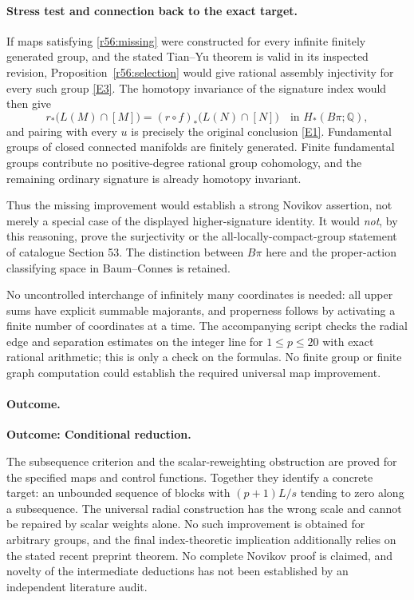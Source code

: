 \documentclass[11pt,a4paper]{article}
\newcommand{\Q}{\mathbb{Q}}
\newcommand{\eref}[2]{\hyperlink{extra:#1:#2}{[E#2]}}
\numberwithin{equation}{section}
\begin{document}
\paragraph{Stress test and connection back to the exact target.}
If maps satisfying \eqref{r56:missing} were constructed for every infinite finitely generated group, and the stated Tian--Yu theorem is valid in its inspected revision, Proposition~\ref{r56:selection} would give rational assembly injectivity for every such group \eref{56}{3}. The homotopy invariance of the signature index would then give
\[
 r_*\bigl(L(M)\cap[M]\bigr)
  =(r\circ f)_*\bigl(L(N)\cap[N]\bigr)
       \quad\text{in }H_*(B\pi;\Q),
\]
and pairing with every $u$ is precisely the original conclusion \eref{56}{1}. Fundamental groups of closed connected manifolds are finitely generated. Finite fundamental groups contribute no positive-degree rational group cohomology, and the remaining ordinary signature is already homotopy invariant.

Thus the missing improvement would establish a strong Novikov assertion, not merely a special case of the displayed higher-signature identity. It would \emph{not}, by this reasoning, prove the surjectivity or the all-locally-compact-group statement of catalogue Section 53. The distinction between $B\pi$ here and the proper-action classifying space in Baum--Connes is retained.

No uncontrolled interchange of infinitely many coordinates is needed: all upper sums have explicit summable majorants, and properness follows by activating a finite number of coordinates at a time. The accompanying script checks the radial edge and separation estimates on the integer line for $1\leq p\leq20$ with exact rational arithmetic; this is only a check on the formulas. No finite group or finite graph computation could establish the required universal map improvement.

\paragraph{Outcome.}
\textbf{Outcome: Conditional reduction.}

The subsequence criterion and the scalar-reweighting obstruction are proved for the specified maps and control functions. Together they identify a concrete target: an unbounded sequence of blocks with $(p+1)L/s$ tending to zero along a subsequence. The universal radial construction has the wrong scale and cannot be repaired by scalar weights alone. No such improvement is obtained for arbitrary groups, and the final index-theoretic implication additionally relies on the stated recent preprint theorem. No complete Novikov proof is claimed, and novelty of the intermediate deductions has not been established by an independent literature audit.
\end{document}
